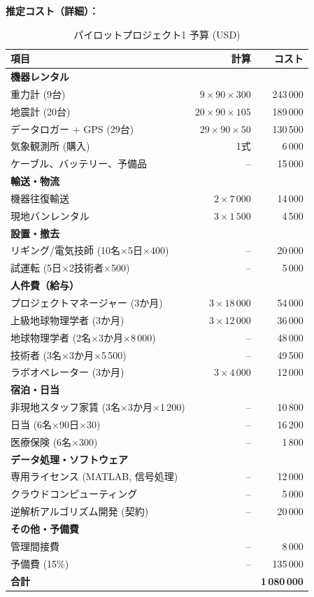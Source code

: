 \documentclass[12pt,a4paper]{article}
\theoremstyle{remark}
\begin{document}
	\textbf{推定コスト（詳細）：}
	\begin{table}[htbp]
		\centering
		\caption{パイロットプロジェクト1 予算 (USD)}
		\label{tab:budget-building}
		\small
		\begin{tabular}{lrr}
			\toprule
			\textbf{項目} & \textbf{計算} & \textbf{コスト} \\
			\midrule
			\multicolumn{3}{l}{\textbf{機器レンタル}} \\
			重力計 (9台) & $9\times90\times300$ & 243\,000 \\
			地震計 (20台) & $20\times90\times105$ & 189\,000 \\
			データロガー + GPS (29台) & $29\times90\times50$ & 130\,500 \\
			気象観測所 (購入) & 1式 & 6\,000 \\
			ケーブル、バッテリー、予備品 & – & 15\,000 \\
			\multicolumn{3}{l}{\textbf{輸送・物流}} \\
			機器往復輸送 & $2\times7\,000$ & 14\,000 \\
			現地バンレンタル & $3\times1\,500$ & 4\,500 \\
			\multicolumn{3}{l}{\textbf{設置・撤去}} \\
			リギング/電気技師 (10名$\times$5日$\times$400) & – & 20\,000 \\
			試運転 (5日$\times$2技術者$\times$500) & – & 5\,000 \\
			\multicolumn{3}{l}{\textbf{人件費（給与）}} \\
			プロジェクトマネージャー (3か月) & $3\times18\,000$ & 54\,000 \\
			上級地球物理学者 (3か月) & $3\times12\,000$ & 36\,000 \\
			地球物理学者 (2名$\times$3か月$\times$8\,000) & – & 48\,000 \\
			技術者 (3名$\times$3か月$\times$5\,500) & – & 49\,500 \\
			ラボオペレーター (3か月) & $3\times4\,000$ & 12\,000 \\
			\multicolumn{3}{l}{\textbf{宿泊・日当}} \\
			非現地スタッフ家賃 (3名$\times$3か月$\times$1\,200) & – & 10\,800 \\
			日当 (6名$\times$90日$\times$30) & – & 16\,200 \\
			医療保険 (6名$\times$300) & – & 1\,800 \\
			\multicolumn{3}{l}{\textbf{データ処理・ソフトウェア}} \\
			専用ライセンス (MATLAB, 信号処理) & – & 12\,000 \\
			クラウドコンピューティング & – & 5\,000 \\
			逆解析アルゴリズム開発 (契約) & – & 20\,000 \\
			\multicolumn{3}{l}{\textbf{その他・予備費}} \\
			管理間接費 & – & 8\,000 \\
			予備費 (15\%) & – & 135\,000 \\
			\midrule
			\textbf{合計} & & \textbf{1\,080\,000} \\
			\bottomrule
		\end{tabular}
	\end{table}
	
\end{document}
